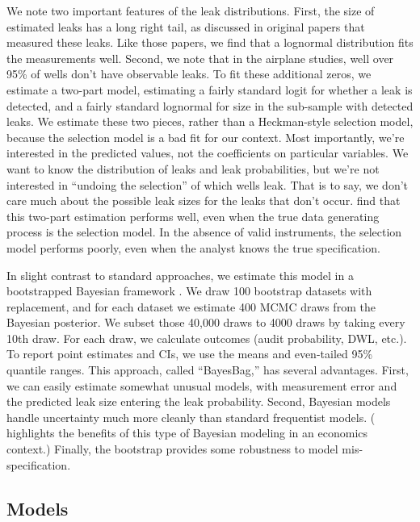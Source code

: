 \documentclass[12pt,oneside,letterpaper]{article}
\theoremstyle{definition}
\begin{document}
\begin{refsection}
We note two important features of the leak distributions.
First, the size of estimated leaks has a long right tail,
as discussed in original papers that measured these leaks.
Like those papers, we find that a lognormal distribution fits the measurements well.
Second, we note that in the airplane studies, well over 95\% of wells don't have observable leaks.
To fit these additional zeros, we estimate a two-part model, estimating a fairly standard logit for whether a leak is detected, and a fairly standard lognormal for size in the sub-sample with detected leaks.
We estimate these two pieces, rather than a Heckman-style selection model, because the selection model is a bad fit for our context.
Most importantly, we're interested in the predicted values, not the coefficients on particular variables.
We want to know the distribution of leaks and leak probabilities, but we're not interested in ``undoing the selection'' of which wells leak.
That is to say, we don't care much about the possible leak sizes for the leaks that don't occur.
\textcite{Manning/Duan/Rogers:1987} find that this two-part estimation performs well, even when the true data generating process is the selection model.
In the absence of valid instruments, the selection model performs poorly, even when the analyst knows the true specification.

In slight contrast to standard approaches, we estimate this model in a bootstrapped Bayesian framework \parencite{Huggins/Miller:2019}.
We draw 100 bootstrap datasets with replacement, and for each dataset we estimate 400 \gls{MCMC} draws from the Bayesian posterior.
We subset those 40,000 draws to 4000 draws by taking every 10th draw.
For each draw, we calculate outcomes (audit probability, \gls{DWL}, etc.).
To report point estimates and \glspl{CI}, we use the means and even-tailed 95\% quantile ranges.
This approach, called ``BayesBag,'' has several advantages.
First, we can easily estimate somewhat unusual models, with measurement error and the predicted leak size entering the leak probability.
Second, Bayesian models handle uncertainty much more cleanly than standard frequentist models.
(\cite{Meager:2019} highlights the benefits of this type of Bayesian modeling in an economics context.)
Finally, the bootstrap provides some robustness to model mis-specification.


\subsection{Models}
\label{sec:models}


\end{refsection}
\end{document}
